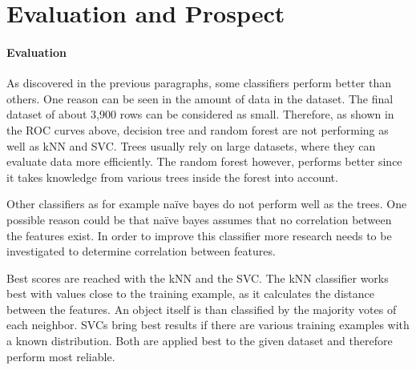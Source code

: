 \section{Evaluation and Prospect}
\paragraph{Evaluation}

\label{cha:prospect}

As discovered in the previous paragraphs, some classifiers perform better than others. One reason can be seen in the amount of data in the dataset. The final dataset of about 3,900 rows can be considered as small. Therefore, as shown in the ROC curves above, decision tree and random forest are not performing as well as kNN and SVC. Trees usually rely on large datasets, where they can evaluate data more efficiently. The random forest however, performs better since it takes knowledge from various trees inside the forest into account.

Other classifiers as for example na\"{i}ve bayes do not perform well as the trees. One possible reason could be that na\"{i}ve bayes assumes that no correlation between the features exist. In order to improve this classifier more research needs to be investigated to determine correlation between features.

Best scores are reached with the kNN and the SVC. The kNN classifier works best with values close to the training example, as it calculates the distance between the features. An object itself is than classified by the majority votes of each neighbor.
SVCs bring best results if there are various training examples with a known distribution. Both are applied best to the given dataset and therefore perform most reliable.








